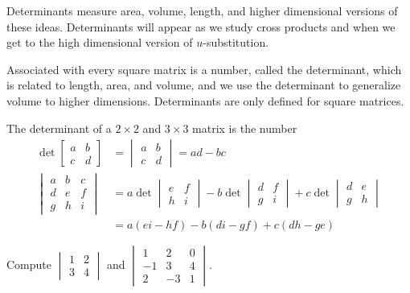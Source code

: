 Determinants measure area, volume, length, and higher dimensional versions of these ideas.  Determinants will appear as we study cross products and when we get to the high dimensional version of {$u$}-substitution.


Associated with every square matrix is a number, called the determinant, which is related to length, area, and volume, and we use the determinant to generalize volume to higher dimensions. Determinants are only defined for square matrices.
\begin{definition}
The determinant of a {$2\times 2$} and {$3\times 3$} matrix is the number 
\begin{align*}
\det\begin{bmatrix}a&b\\c&d\end{bmatrix} &=\begin{vmatrix}a&b\\c&d\end{vmatrix} = ad-bc\\
\begin{vmatrix}a&b&c\\d&e&f\\g&h&i\end{vmatrix} &= a\det\begin{vmatrix}e&f\\h&i\end{vmatrix} -b\det\begin{vmatrix}d&f\\g&i\end{vmatrix} +c\det\begin{vmatrix}d&e\\g&h\end{vmatrix}\\
&=a(ei-hf)-b(di-gf)+c(dh-ge)
\end{align*}
\end{definition}

\begin{problem}
Compute 
$\begin{vmatrix}
1&2\\
3&4
\end{vmatrix} 
$
and 
$\begin{vmatrix}
1&2&0\\
-1&3&4\\
2&-3&1
\end{vmatrix} 
$.
\end{problem}

